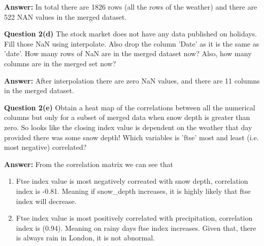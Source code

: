 \documentclass[letterpaper,12pt]{article}
\begin{document}
\textbf{Answer:} In total there are 1826 rows (all the rows of the weather) and there are 522 NAN values in the merged dataset.

\noindent \textbf{Question 2(d)} The stock market does not have any data published on holidays. Fill those NaN using interpolate. Also drop the column ’Date’ as it is the same as ’date’. How many rows of NaN are in the merged dataset now? Also, how many columns are in the merged set now?

\textbf{Answer:} After interpolation there are zero NaN values, and there are 11 columns in the merged dataset.

\noindent \textbf{Question 2(e)} Obtain a heat map of the correlations between all the numerical columns but only for a subset of merged data when snow depth is greater than zero. So looks like the closing index value is dependent on the weather that day provided there was some snow depth! Which variables is ’ftse’ most and least (i.e. most negative) correlated? 

\textbf{Answer:} From the correlation matrix we can see that
\begin{enumerate}
	\item Ftse index value is most negatively correated with snow depth, correlation index is -0.81. Meaning if snow\_depth increases, it is highly likely that ftse index will decrease.
	\item Ftse index value is most positively correlated with precipitation, correlation index is (0.94). Meaning on rainy days ftse index increases. Given that, there is always rain in London, it is not abnormal.
\end{enumerate}
\end{document}

